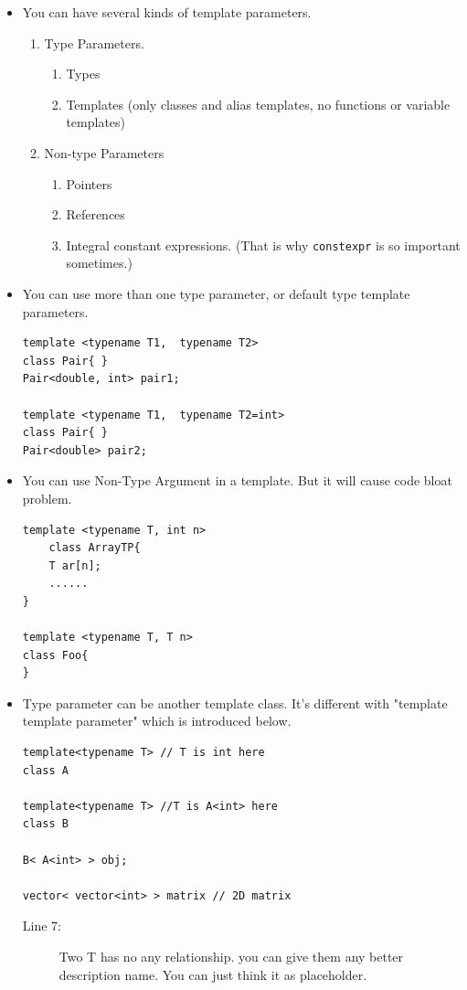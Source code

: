\documentclass[a4paper,11pt,twoside]{book}
\begin{document}
\begin{itemize}
\item You can have several kinds of template parameters.
\begin{enumerate}
\item  Type Parameters.
  	\begin{enumerate}
   	\item Types
    \item Templates (only classes and alias templates, no functions or variable templates)
	\end{enumerate}

\item Non-type Parameters
   \begin{enumerate}
	\item Pointers
	\item References
	\item Integral constant expressions. (That is why \texttt{constexpr} is so important sometimes.)
	\end{enumerate}
\end{enumerate}

\item You can use more than one type parameter, or default type template parameters.
\begin{lstlisting}[numbers=none]
template <typename T1,  typename T2>
class Pair{ }
Pair<double, int> pair1;

template <typename T1,  typename T2=int>
class Pair{ }
Pair<double> pair2;
\end{lstlisting}

\item You can use Non-Type Argument in a template. But it will cause code bloat problem. 
\begin{lstlisting}[numbers=none]
template <typename T, int n>
	class ArrayTP{
	T ar[n];
	......
}

template <typename T, T n>
class Foo{
}
\end{lstlisting}

\item Type parameter can be another template class.  It's different with "template template parameter" which is introduced below.
\begin{lstlisting}[numbers=none]
template<typename T> // T is int here
class A

template<typename T> //T is A<int> here
class B

B< A<int> > obj;

vector< vector<int> > matrix // 2D matrix
\end{lstlisting}
\begin{description}
	\item[Line 7:] Two T has no any relationship. you can give them any better description name. You can just think it as placeholder.
\end{description}


\end{itemize}
\end{document}
